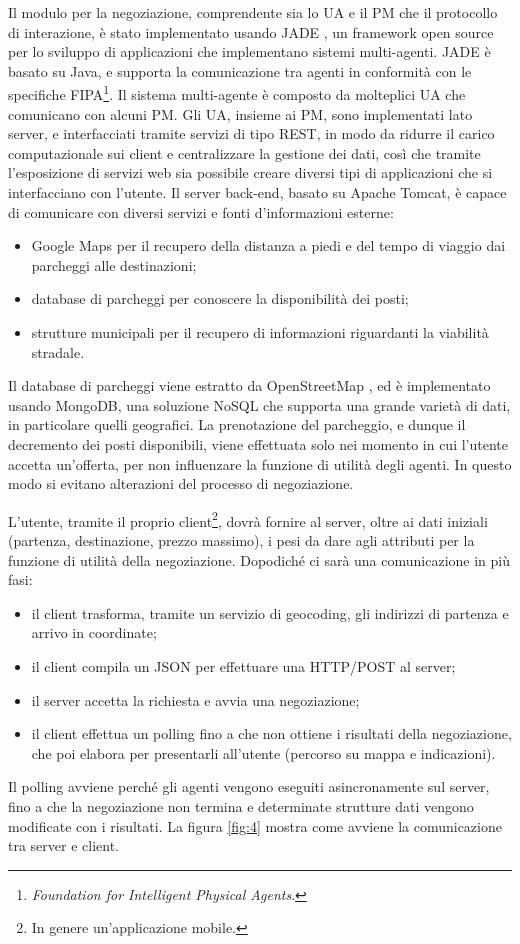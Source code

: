 \documentclass[11pt,a4paper,twoside]{article}
\numberwithin{figure}{section}
\numberwithin{equation}{section}
\begin{document}
Il modulo per la negoziazione, comprendente sia lo UA e il PM che il protocollo di interazione, è stato implementato usando JADE \cite{11}, un framework open source per lo sviluppo di applicazioni che implementano sistemi multi-agenti. JADE è basato su Java, e supporta la comunicazione tra agenti in conformità con le specifiche FIPA\footnote{\emph{Foundation for Intelligent Physical Agents}.}. Il sistema multi-agente è composto da molteplici UA che comunicano con alcuni PM. Gli UA, insieme ai PM, sono implementati lato server, e interfacciati tramite servizi di tipo REST, in modo da ridurre il carico computazionale sui client e centralizzare la gestione dei dati, così che tramite l'esposizione di servizi web sia possibile creare diversi tipi di applicazioni che si interfacciano con l'utente. Il server back-end, basato su Apache Tomcat, è capace di comunicare con diversi servizi e fonti d'informazioni esterne:
\begin{itemize}
    \item Google Maps \cite{12} per il recupero della distanza a piedi e del tempo di viaggio dai parcheggi alle destinazioni;
    \item database di parcheggi per conoscere la disponibilità dei posti;
    \item strutture municipali per il recupero di informazioni riguardanti la viabilità stradale.
\end{itemize}
Il database di parcheggi viene estratto da OpenStreetMap \cite{13}, ed è implementato usando MongoDB, una soluzione NoSQL che supporta una grande varietà di dati, in particolare quelli geografici.
La prenotazione del parcheggio, e dunque il decremento dei posti disponibili, viene effettuata solo nei momento in cui l'utente accetta un'offerta, per non influenzare la funzione di utilità degli agenti. In questo modo si evitano alterazioni del processo di negoziazione.

L'utente, tramite il proprio client\footnote{In genere un'applicazione mobile.}, dovrà fornire al server, oltre ai dati iniziali (partenza, destinazione, prezzo massimo), i pesi da dare agli attributi per la funzione di utilità della negoziazione.
Dopodiché ci sarà una comunicazione in più fasi:
\begin{itemize}
    \item il client trasforma, tramite un servizio di geocoding, gli indirizzi di partenza e arrivo in coordinate;
    \item il client compila un JSON per effettuare una HTTP/POST al server;
    \item il server accetta la richiesta e avvia una negoziazione;
    \item il client effettua un polling fino a che non ottiene i risultati della negoziazione, che poi elabora per presentarli all'utente (percorso su mappa e indicazioni).
\end{itemize}
Il polling avviene perché gli agenti vengono eseguiti asincronamente sul server, fino a che la negoziazione non termina e determinate strutture dati vengono modificate con i risultati.
La figura \ref{fig:4} mostra come avviene la comunicazione tra server e client.
\end{document}

